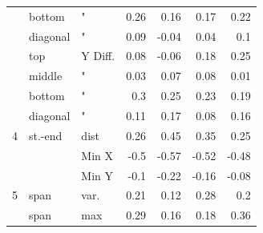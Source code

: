 \documentclass{sigchi}
\begin{document}
\begin{table}[ht]
\begin{tabular}{|lll|rrrr|}
    ~    & bottom 		& "         & 0.26  & 0.16   & 0.17   & 0.22  \\
    ~    & diagonal 	& "         & 0.09  & -0.04  & 0.04   & 0.1   \\
    ~    & top  			& Y Diff.   & 0.08  & -0.06		& 0.18   & 0.25  \\
    ~    & middle  		& "         & 0.03  & 0.07   & 0.08   & 0.01  \\
    ~    & bottom 		& "         & 0.3   & 0.25   & 0.23   & 0.19  \\
    ~    & diagonal 	& "         & 0.11  & 0.17   & 0.08   & 0.16  \\ \hline
    4    & st.-end   	& dist      & 0.26  & \cellcolor[gray]{0.9}0.45   & 0.35   & 0.25  \\
    ~    & ~          & Min X     & -0.5  & \cellcolor[gray]{0.9}-0.57  & -0.52  & -0.48 \\
    ~    & ~          & Min Y     & -0.1  & -0.22  & -0.16  & -0.08 \\ \hline
    5    & span       & var.      & 0.21  & 0.12   & 0.28   & 0.2   \\
    ~    & span       & max       & 0.29  & 0.16   & 0.18   & \cellcolor[gray]{0.9}0.36  \\ \hline
    \end{tabular}
\end{table}
\end{document}
